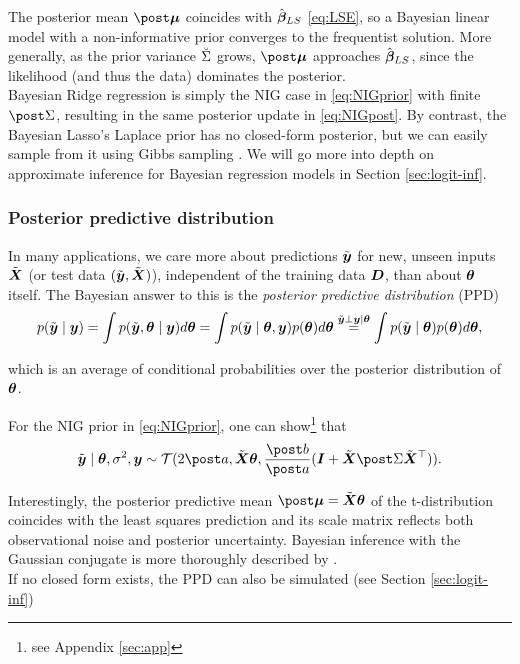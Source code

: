 The posterior mean $\mupo$ coincides with $\hat{\bm{\beta}}_{LS}$ \eqref{eq:LSE}, so a Bayesian linear model with a non-informative prior converges to the frequentist solution.
More generally, as the prior variance $\breve{\Sigma}$ grows, $\mupo$ approaches $\hat{\bm{\beta}}_{LS}$, since the likelihood (and thus the data) dominates the posterior.\\

Bayesian Ridge regression is simply the NIG case in \eqref{eq:NIGprior} with finite $\Sdpo$, resulting in the same posterior update in \eqref{eq:NIGpost}.
By contrast, the Bayesian Lasso's Laplace prior has no closed-form posterior, but we can easily sample from it using Gibbs sampling \citep{park_bayesian_2008}.
We will go more into depth on approximate inference for Bayesian regression models in Section \ref{sec:logit-inf}.

\subsubsection*{Posterior predictive distribution}
In many applications, we care more about predictions $\tilde{\bm{y}}$ for new, unseen inputs $\tilde{\bm{X}}$ (or test data $(\tilde{\bm{y}}, \tilde{\bm{X}})$), independent of the training data $\bm{D}$, than about $\bm{\theta}$ itself.
The Bayesian answer to this is the \textit{posterior predictive distribution} (PPD) 
\begin{equation*}
    p(\tilde{\bm{y}} \mid \bm{y}) = \int p(\tilde{\bm{y}}, \bm{\theta} \mid \bm{y}) d \bm{\theta} 
    = \int p(\tilde{\bm{y}} \mid \bm{\theta}, \bm{y}) p(\bm{\theta}) d \bm{\theta}
    \overset{\tilde{\bm{y}} \perp \bm{y} \mid \bm{\theta}}{=}  \int p(\tilde{\bm{y}} \mid \bm{\theta}) p(\bm{\theta}) d \bm{\theta},
\end{equation*}

which is an average of conditional probabilities over the posterior distribution of $\bm{\theta}$.\footnotemark


For the NIG prior in \eqref{eq:NIGprior}, one can show\footnote{see Appendix \ref{sec:app}} that
\begin{equation*}
    \ty \mid \btheta, \ssd, \by \sim \Tcal(2 \apo, \tX \btheta, \frac{\bpo}{\apo} (\bI + \tX \Sdpo \tX^\top)).
\end{equation*}

Interestingly, the posterior predictive mean $\mupo = \tX \btheta$ of the t-distribution coincides with the least squares prediction and its scale matrix reflects both observational noise and posterior uncertainty.
Bayesian inference with the Gaussian conjugate is more thoroughly described by \citet{murphy_conjugate_nodate}.\\

If no closed form exists, the PPD can also be simulated (see Section \ref{sec:logit-inf})
